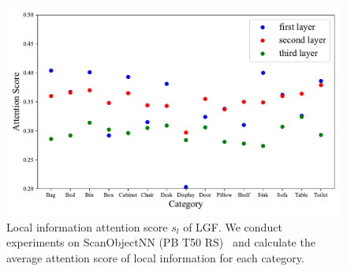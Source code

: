 \begin{figure}
    \centering
    \includegraphics[width=\linewidth]{fig/supplement/hardest.pdf}
    \caption{Local information attention score $s_l$ of LGF. We conduct experiments on ScanObjectNN (PB T50 RS)~\cite{uy2019revisiting} and calculate the average attention score of local information for each category.
}
    \label{fig:attention_score}
\end{figure}